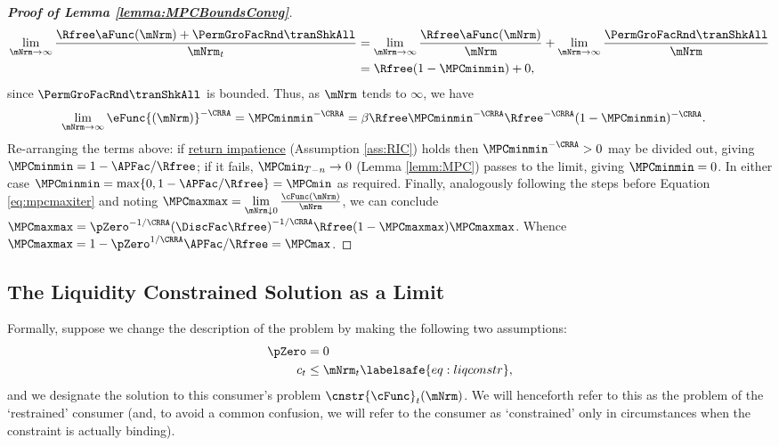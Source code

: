 \documentclass[\econtexRoot/BufferStockTheory]{subfiles}
\begin{document}
\begin{proof}[\textbf{Proof of Lemma \ref{lemma:MPCBoundsConvg}}]
\begin{equation}\begin{gathered}\begin{aligned}
\lim_{\mNrm\rightarrow \infty}\frac{\Rfree \aFunc(\mNrm)+{\PermGroFacRnd}{\tranShkAll}}{\mNrm_{t}} &  = \lim_{\mNrm \rightarrow \infty}\frac{\Rfree \aFunc(\mNrm)}{\mNrm} + \lim_{\mNrm\rightarrow \infty}\frac{{\PermGroFacRnd}{\tranShkAll}}{\mNrm} \\
			& = \Rfree (1- \MPCminmin) + 0, 
\end{aligned}\end{gathered}\end{equation}
since ${\PermGroFacRnd}{\tranShkAll}$ is bounded.
Thus, as $\mNrm$ tends to $\infty$, we have
%
\begin{equation}\begin{gathered}\begin{aligned} %
 \lim\limits_{\mNrm\rightarrow \infty}\eFunc{(\mNrm)}^{-\CRRA}  & =  \MPCminmin^{-\CRRA} = \beta\Rfree\MPCminmin^{-\CRRA}\Rfree^{-\CRRA} (1- \MPCminmin) ^{-\CRRA}. 
\end{aligned}\end{gathered}\end{equation}
%
Re-arranging the terms above: if \hyperlink{RIC}{return impatience} (Assumption \ref{ass:RIC}) holds then $\MPCminmin^{-\CRRA}>0$ may be divided out, giving $\MPCminmin =1-  \APFac/\Rfree$; if it fails, $\MPCmin_{T-n}\rightarrow 0$ (Lemma \ref{lemm:MPC}) passes to the limit, giving $\MPCminmin=0$. In either case $\MPCminmin=\max\{0,1-\APFac/\Rfree\}=\MPCmin$ as required.
Finally, analogously following the steps before Equation \eqref{eq:mpcmaxiter} and noting $\MPCmaxmax = \lim\limits_{\mNrm\downarrow 0}\frac{\cFunc(\mNrm)}{\mNrm}$, we can conclude $\MPCmaxmax  = \pZero^{-1/\CRRA} {(\DiscFac
\Rfree)}^{-1/\CRRA}\Rfree(1-\MPCmaxmax)\MPCmaxmax$.
Whence $\MPCmaxmax = 1- \pZero^{1/\CRRA}\APFac/\Rfree = \MPCmax$.




%
\end{proof}

\subsection{The Liquidity Constrained Solution as a Limit}\label{sec:LiqConstrAsLimit}

Formally, suppose we change the description of the problem by making
the following two assumptions:
\begin{eqnarray*}
  \pZero   & = 0
  \\  c_{t} & \leq  \mNrm_{t} \labelsafe{eq:liqconstr},
\end{eqnarray*}
and we designate the solution to this consumer's problem $\cnstr{\cFunc}_{t}(\mNrm)$.
We will henceforth refer to this as the problem of the `restrained' consumer (and, to avoid a common confusion, we will refer to the consumer as `constrained' only in circumstances when the constraint is actually binding).
\end{document}
